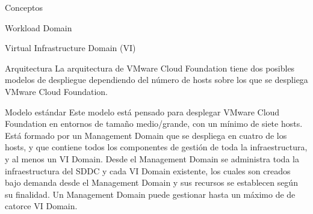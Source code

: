 \begin{section}{Conceptos}
\begin{subsection}{Workload Domain}
\begin{subsubsection}{Virtual Infrastructure Domain (VI)}


 \end{subsubsection}

\end{subsection}




\begin{subsection}{Arquitectura}
La arquitectura de VMware Cloud Foundation tiene dos posibles modelos de despliegue dependiendo del número de hosts sobre los que se despliega VMware Cloud Foundation.
\begin{subsubsection}{Modelo estándar}
Este modelo está pensado para desplegar VMware Cloud Foundation en entornos de tamaño medio/grande, con un mínimo de siete hosts. Está formado por un Management Domain que se despliega en cuatro de los hosts, y que contiene todos los componentes de gestión de toda la infraestructura, y al menos un VI Domain. Desde el Management Domain se administra toda la infraestructura del SDDC y cada VI Domain existente, los cuales son creados bajo demanda desde el Management Domain y sus recursos se establecen según su finalidad. Un Management Domain puede gestionar hasta un máximo de de catorce VI Domain. 


\end{subsubsection}
\end{subsection}
\end{section}
